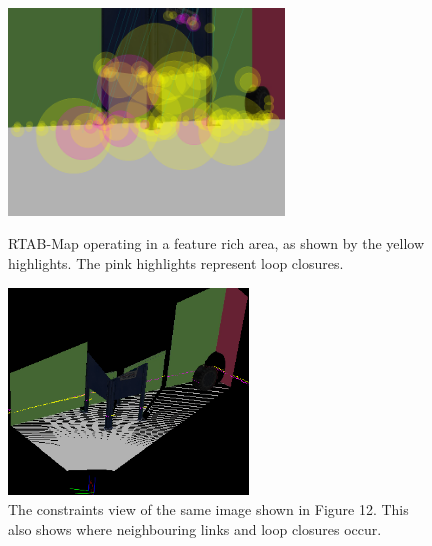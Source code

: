 \documentclass[a4paper]{article}
\begin{document}
\begin{figure}[h]
\centering
\begin{minipage}[t]{0.45\textwidth}
\centering
\includegraphics[height=5.5cm]{slam_house_features_corner_2}
\caption{RTAB-Map operating in a feature rich area, as shown by the yellow highlights. The pink highlights represent loop closures.}
\end{minipage}
\hspace{1cm}
\begin{minipage}[t]{0.45\textwidth}
\centering
\includegraphics[height=5.5cm]{slam_house_constraints_2}
\caption{The constraints view of the same image shown in Figure 12. This also shows where neighbouring links and loop closures occur.}
\end{minipage}
\end{figure}
\end{document}

